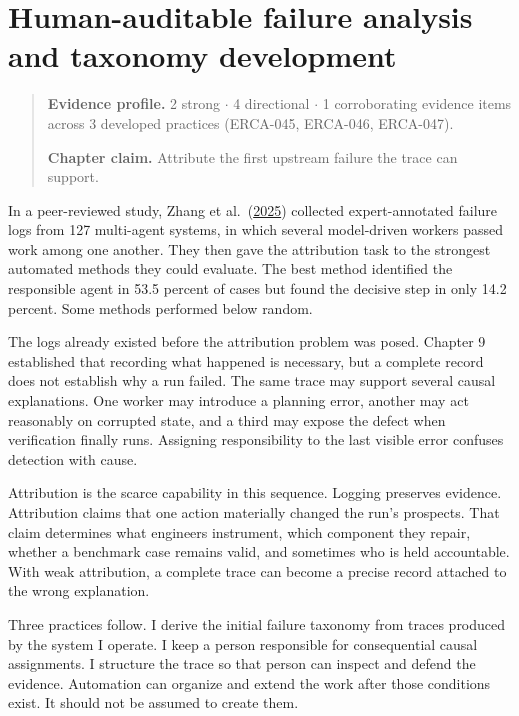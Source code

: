 \chapter{Human-auditable failure analysis and taxonomy development}
\label{ch10-human-auditable-failure-analysis-taxonomy}
\begin{quote}
\textbf{Evidence profile.} 2 strong \(\cdot\) 4 directional \(\cdot\) 1 corroborating evidence items across 3 developed practices (ERCA-045, ERCA-046, ERCA-047).

\textbf{Chapter claim.} Attribute the first upstream failure the trace can support.
\end{quote}

In a peer-reviewed study, Zhang et al.~(\href{https://arxiv.org/abs/2505.00212}{2025}) collected expert-annotated failure logs from 127 multi-agent systems, in which several model-driven workers passed work among one another. They then gave the attribution task to the strongest automated methods they could evaluate. The best method identified the responsible agent in 53.5 percent of cases but found the decisive step in only 14.2 percent. Some methods performed below random.

The logs already existed before the attribution problem was posed. Chapter 9 established that recording what happened is necessary, but a complete record does not establish why a run failed. The same trace may support several causal explanations. One worker may introduce a planning error, another may act reasonably on corrupted state, and a third may expose the defect when verification finally runs. Assigning responsibility to the last visible error confuses detection with cause.

Attribution is the scarce capability in this sequence. Logging preserves evidence. Attribution claims that one action materially changed the run's prospects. That claim determines what engineers instrument, which component they repair, whether a benchmark case remains valid, and sometimes who is held accountable. With weak attribution, a complete trace can become a precise record attached to the wrong explanation.

Three practices follow. I derive the initial failure taxonomy from traces produced by the system I operate. I keep a person responsible for consequential causal assignments. I structure the trace so that person can inspect and defend the evidence. Automation can organize and extend the work after those conditions exist. It should not be assumed to create them.

